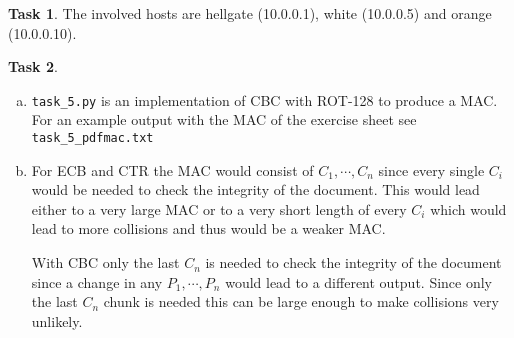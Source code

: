 \documentclass[ngerman, fleqn, DIV=15, headinclude]{scrartcl}
\title{}
\author{
    Timm Behner \\ \small{\href{mailto:behner@cs.uni-bonn.de}{behner@cs.uni-bonn.de}} \and
    Christopher Kannen \\ \small{\href{mailto:ckannen@uni-bonn.de}{ckannen@uni-bonn.de}}
}
\theoremstyle{definition}
\newtheorem{exercise}{Task}
\begin{document}
\maketitle


\setcounter{exercise}{1}

\begin{exercise}
    The involved hosts are hellgate (10.0.0.1), white (10.0.0.5) and orange
    (10.0.0.10).
    \begin{figure}[H]
        \centering
    \end{figure}
\end{exercise}

\setcounter{exercise}{4}
\begin{exercise}
    \begin{enumerate}[a)]
        \item \verb$task_5.py$ is an implementation of CBC with ROT-128 to
            produce a MAC. For an example output with the MAC of the exercise
            sheet see \verb$task_5_pdfmac.txt$
        \item For ECB and CTR the MAC would consist of $C_1, \cdots , C_n$
            since every single $C_i$ would be needed to check the integrity of
            the document. This would lead either to a very large MAC or to a
            very short length of every $C_i$ which would lead to more
            collisions and thus would be a weaker MAC.

            With CBC only the last $C_n$ is needed to check the integrity of
            the document since a change in any $P_1, \cdots, P_n$ would lead to
            a different output. Since only the last $C_n$ chunk is needed this
            can be large enough to make collisions very unlikely.
    \end{enumerate}
\end{exercise}
\end{document}
